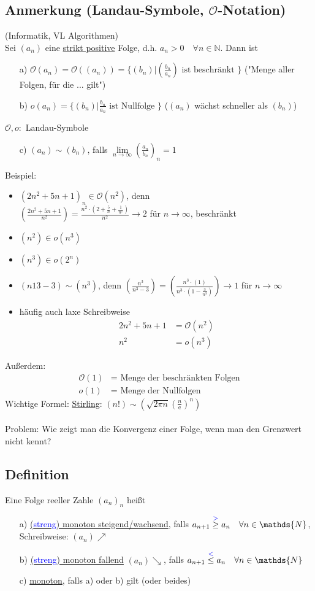 \documentclass[12pt, titlepage]{article}
\newcommand{\N}{\mathds{N}}
\newcommand{\e}{\textrm{e}}
\newcommand{\infn}{n\rightarrow\infty}
\newcommand{\bmark}[1]{\textcolor{blue}{#1}}
\renewcommand{\*}{\cdot}
\begin{document}
	\subsection{Anmerkung (Landau-Symbole, $\mathcal{O}$-Notation)}
	(Informatik, VL Algorithmen)\\
	Sei $(a_n)$ eine \underline{strikt positive} Folge, d.h. $a_n>0\quad\forall n\in\N$. Dann ist
	\begin{itemize}
		\item[a)] $\mathcal{O}(a_n)=\mathcal{O}((a_n))=\{(b_n)|(\frac{b_n}{a_n})\textrm{ ist beschränkt }\}$ ("Menge aller Folgen, für die ... gilt")
		\item[b)] $o(a_n)=\{(b_n)|\frac{b_n}{a_n}\textrm{ ist Nullfolge }\}$ ($(a_n)$ wächst schneller als $(b_n)$)
	\end{itemize}
	$\mathcal{O},o\colon $ Landau-Symbole
	\begin{itemize}
		\item[c)] $(a_n)\sim(b_n)$, falls $\lim\limits_{\infn}(\frac{a_n}{b_n})_n=1$
	\end{itemize}
	Beispiel:
	\begin{itemize}
		\item $(2n^2+5n+1)_n\in\mathcal{O}(n^2)$, denn\\
		$(\frac{2n^2+5n+1}{n^2})=\frac{n^2\*(2+\frac{5}{n}+\frac{1}{n^2})}{n^2}\rightarrow2$ für $\infn$, beschränkt
		\item $(n^2)\in o(n^3)$
		\item $(n^3)\in o(2^n)$
		\item $(n13-3)\sim(n^3)$, denn $(\frac{n^3}{n^3-3})=(\frac{n^3\*(1)}{n^3\*(1-\frac{3}{n^3})})\rightarrow1$ für $\infn$
		\item häufig auch laxe Schreibweise
		\begin{align*}
			2n^2+5n+1&=\mathcal{O}(n^2)\\
			n^2&=o(n^3)
		\end{align*}
	\end{itemize}
	Außerdem:
	\begin{align*}
		\mathcal{O}(1)&=\textrm{ Menge der beschränkten Folgen}\\
		o(1)&=\textrm{ Menge der Nullfolgen}
	\end{align*}
	Wichtige Formel: \underline{Stirling}: $(n!)\sim(\sqrt{2\pi n}(\frac{n}{\e})^n)$\\
	\\
	Problem: Wie zeigt man die Konvergenz einer Folge, wenn man den Grenzwert nicht kennt?
	\subsection{Definition}
	Eine Folge reeller Zahle $(a_n)_n$ heißt
	\begin{itemize}
		\item[a)] \underline{(\bmark{streng}) monoton steigend/wachsend}, falls $a_{n+1}\overset{\bmark{>}}{\geq}a_n\quad\forall n\in\N$, Schreibweise: $(a_n)\nearrow$
		\item[b)] \underline{(\bmark{streng}) monoton fallend} $(a_n)\searrow$, falls $a_{n+1}\overset{\bmark{<}}{\leq}a_n\quad\forall n\in\N$
		\item[c)] \underline{monoton}, falls a) oder b) gilt (oder beides)
	\end{itemize}	
\end{document}
